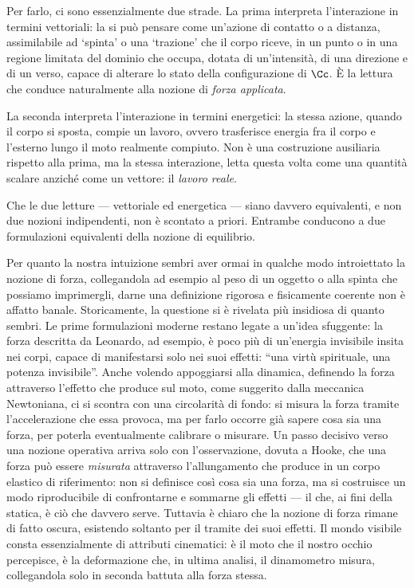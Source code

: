  Per farlo, ci sono essenzialmente due strade.
La prima  interpreta l'interazione in termini vettoriali: la si può pensare come un'azione di contatto o a distanza, 
assimilabile ad `spinta' o una `trazione' che il corpo riceve, in un punto o in una 
regione limitata del dominio che occupa, dotata di un'intensità, di
una direzione e di un verso, capace di
alterare lo stato della configurazione di $\Cc$. È la lettura che conduce naturalmente 
alla nozione di \emph{forza applicata}.

La seconda  interpreta l'interazione in termini energetici: la stessa azione, quando il
corpo si sposta, compie un lavoro, ovvero trasferisce  energia fra il
corpo e l'esterno lungo il moto realmente compiuto. Non è una
costruzione ausiliaria rispetto alla prima, ma la stessa interazione,
letta questa volta come una quantità scalare anziché come un vettore: 
il \emph{lavoro reale}.

Che le due letture --- vettoriale ed energetica --- siano davvero
equivalenti, e non due nozioni indipendenti, non è scontato a priori. Entrambe conducono a due formulazioni equivalenti della nozione di
equilibrio.

Per quanto la nostra intuizione sembri aver ormai in qualche modo introiettato la nozione di forza,
collegandola ad esempio al peso di un oggetto o alla spinta che possiamo imprimergli,
darne una definizione rigorosa e fisicamente coerente non è affatto banale.
Storicamente, la questione si è rivelata più insidiosa di quanto
sembri. Le prime formulazioni moderne restano legate a
un'idea sfuggente: la forza descritta da Leonardo, ad
esempio, è poco più di un'energia invisibile insita nei corpi, capace di
manifestarsi solo nei suoi effetti: ``una virtù spirituale, una potenza invisibile''.  Anche volendo appoggiarsi alla
dinamica, definendo la forza attraverso l'effetto che produce sul moto, come suggerito dalla meccanica Newtoniana,
ci si scontra con una circolarità di fondo: si misura la forza tramite
l'accelerazione che essa provoca, ma per farlo occorre già sapere cosa
sia una forza, per poterla eventualmente calibrare o misurare. Un
passo decisivo verso una nozione operativa arriva solo con
l'osservazione, dovuta a Hooke, che una forza può essere \emph{misurata}
attraverso l'allungamento che produce in un corpo elastico di
riferimento: non si definisce così cosa sia una forza, ma si costruisce
un modo riproducibile di confrontarne e sommarne gli effetti --- il che,
ai fini della statica, è ciò che davvero serve. Tuttavia è chiaro che la nozione di forza
rimane di fatto oscura, esistendo soltanto per il tramite dei suoi effetti. Il mondo visibile 
consta essenzialmente di attributi cinematici: è il moto che il nostro occhio percepisce,
è la deformazione che, in ultima analisi, il dinamometro misura, collegandola solo in seconda battuta 
alla forza stessa.

